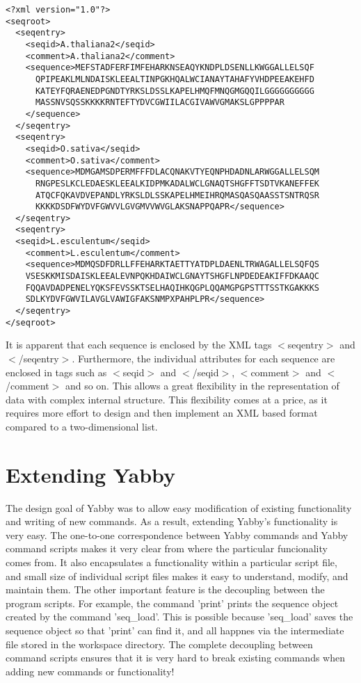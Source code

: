 \begin{verbatim}
<?xml version="1.0"?>
<seqroot>
  <seqentry>
    <seqid>A.thaliana2</seqid>
    <comment>A.thaliana2</comment>
    <sequence>MEFSTADFERFIMFEHARKNSEAQYKNDPLDSENLLKWGGALLELSQF
      QPIPEAKLMLNDAISKLEEALTINPGKHQALWCIANAYTAHAFYVHDPEEAKEHFD
      KATEYFQRAENEDPGNDTYRKSLDSSLKAPELHMQFMNQGMGQQILGGGGGGGGGG
      MASSNVSQSSKKKKRNTEFTYDVCGWIILACGIVAWVGMAKSLGPPPPAR
    </sequence>
  </seqentry>
  <seqentry>
    <seqid>O.sativa</seqid>
    <comment>O.sativa</comment>
    <sequence>MDMGAMSDPERMFFFDLACQNAKVTYEQNPHDADNLARWGGALLELSQM
      RNGPESLKCLEDAESKLEEALKIDPMKADALWCLGNAQTSHGFFTSDTVKANEFFEK
      ATQCFQKAVDVEPANDLYRKSLDLSSKAPELHMEIHRQMASQASQAASSTSNTRQSR
      KKKKDSDFWYDVFGWVVLGVGMVVWVGLAKSNAPPQAPR</sequence>
  </seqentry>
  <seqentry>
  <seqid>L.esculentum</seqid>
    <comment>L.esculentum</comment>
    <sequence>MDMQSDFDRLLFFEHARKTAETTYATDPLDAENLTRWAGALLELSQFQS
    VSESKKMISDAISKLEEALEVNPQKHDAIWCLGNAYTSHGFLNPDEDEAKIFFDKAAQC
    FQQAVDADPENELYQKSFEVSSKTSELHAQIHKQGPLQQAMGPGPSTTTSSTKGAKKKS
    SDLKYDVFGWVILAVGLVAWIGFAKSNMPXPAHPLPR</sequence>
  </seqentry>
</seqroot>
\end{verbatim}

It is apparent that each sequence is enclosed by the XML tags
$<$seqentry$>$ and $<$/seqentry$>$. Furthermore, the individual
attributes for each sequence are enclosed in tags such as
$<$seqid$>$ and $<$/seqid$>$, $<$comment$>$ and $<$/comment$>$
and so on. This allows a great flexibility in the representation
of data with complex internal structure. This flexibility comes
at a price, as it requires more effort to design and then implement
an XML based format compared to a two-dimensional list. 

\section{Extending Yabby}

The design goal of Yabby was to allow easy modification of existing
functionality and writing of new commands. As a result, extending
Yabby's functionality is very easy. The one-to-one correspondence
between Yabby commands and Yabby command scripts makes it very clear
from where the particular funcionality comes from. It also encapsulates
a functionality within a particular script file, and small size of
individual script files makes it easy to understand, modify, and
maintain them.  The other important feature is the decoupling between
the program scripts. For example, the command 'print' prints the
sequence object created by the command 'seq\_load'. This is possible
because 'seq\_load' saves the sequence object so that 'print' can
find it, and all happnes via the intermediate file stored in the
workspace directory. The complete decoupling between command scripts
ensures that it is very hard to break existing commands when adding
new commands or functionality!

